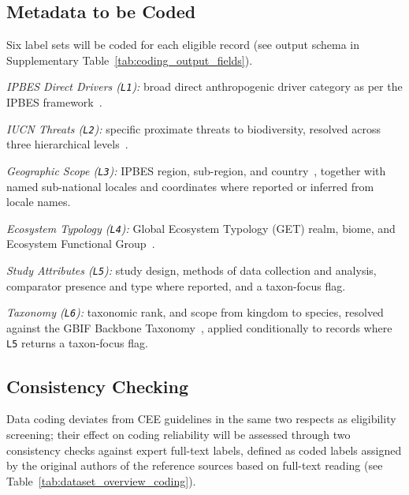 \documentclass[12pt]{article}
\begin{document}
\subsection*{Metadata to be Coded}
Six label sets will be coded for each eligible record (see output schema in Supplementary Table~\ref{tab:coding_output_fields}).

\emph{IPBES Direct Drivers (\texttt{L1}):} 
broad direct anthropogenic driver category as per the IPBES framework~\cite{diaz_ipbes_2015}.

\emph{IUCN Threats (\texttt{L2}):} 
specific proximate threats to biodiversity, resolved across three hierarchical levels~\cite{iucn_threats_classification_2022}.

\emph{Geographic Scope (\texttt{L3}):} IPBES region, sub-region, and country~\cite{data_ipbes_geo}, together with named sub-national locales and coordinates where reported or inferred from locale names.

\emph{Ecosystem Typology (\texttt{L4}):} Global Ecosystem Typology (GET) realm, biome, and Ecosystem Functional Group~\cite{keith2022function_get}.

\emph{Study Attributes (\texttt{L5}):} 
study design, methods of data collection and analysis, comparator presence and type where reported, and a taxon-focus flag.

\emph{Taxonomy (\texttt{L6}):} 
taxonomic rank, and scope from kingdom to species, resolved against the GBIF Backbone Taxonomy~\cite{GBIFBackboneTaxonomy_general}, applied conditionally to records where \texttt{L5} returns a taxon-focus flag.
\subsection*{Consistency Checking}
Data coding deviates from CEE guidelines in the same two respects as eligibility screening; their effect on coding reliability will be assessed through two consistency checks against expert full-text labels, defined as coded labels assigned by the original authors of the reference sources based on full-text reading (see Table~\ref{tab:dataset_overview_coding}).
\end{document}
